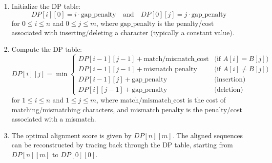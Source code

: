 \documentclass[12pt]{book} %
\begin{document}
\begin{enumerate}
    \item Initialize the DP table:
    \[
    DP[i][0] = i \cdot \text{gap\_penalty} \quad \text{and} \quad DP[0][j] = j \cdot \text{gap\_penalty}
    \]
    for \( 0 \leq i \leq n \) and \( 0 \leq j \leq m \), where \( \text{gap\_penalty} \) is the penalty/cost associated with inserting/deleting a character (typically a constant value).
    
    \item Compute the DP table:
    \[
    DP[i][j] = \min \begin{cases}
        DP[i-1][j-1] + \text{match/mismatch\_cost} & \text{(if } A[i] = B[j]) \\
        DP[i-1][j-1] + \text{mismatch\_penalty} & \text{(if } A[i] \neq B[j]) \\
        DP[i-1][j] + \text{gap\_penalty} & \text{(insertion)} \\
        DP[i][j-1] + \text{gap\_penalty} & \text{(deletion)}
    \end{cases}
    \]
    for \( 1 \leq i \leq n \) and \( 1 \leq j \leq m \), where \( \text{match/mismatch\_cost} \) is the cost of matching/mismatching characters, and \( \text{mismatch\_penalty} \) is the penalty/cost associated with a mismatch.
    
    \item The optimal alignment score is given by \( DP[n][m] \). The aligned sequences can be reconstructed by tracing back through the DP table, starting from \( DP[n][m] \) to \( DP[0][0] \).
\end{enumerate}
\end{document}

